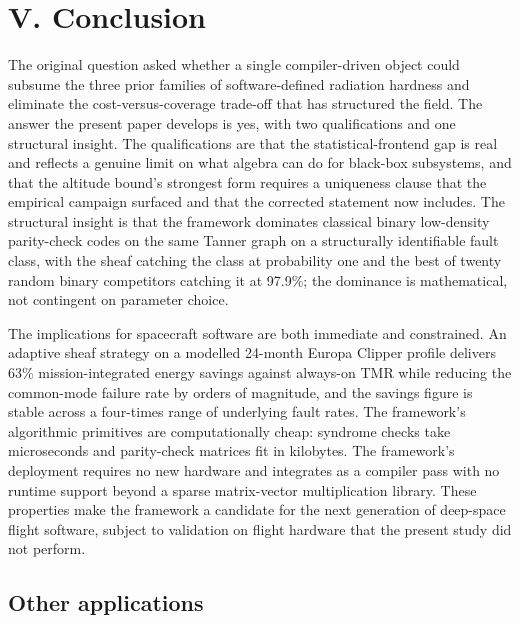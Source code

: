 \documentclass[12pt,a4paper]{article}
\theoremstyle{plain}
\theoremstyle{definition}
\begin{document}
\section{V. Conclusion}

The original question asked whether a single compiler-driven object could subsume the three prior families of software-defined radiation hardness and eliminate the cost-versus-coverage trade-off that has structured the field. The answer the present paper develops is yes, with two qualifications and one structural insight. The qualifications are that the statistical-frontend gap is real and reflects a genuine limit on what algebra can do for black-box subsystems, and that the altitude bound's strongest form requires a uniqueness clause that the empirical campaign surfaced and that the corrected statement now includes. The structural insight is that the framework dominates classical binary low-density parity-check codes on the same Tanner graph on a structurally identifiable fault class, with the sheaf catching the class at probability one and the best of twenty random binary competitors catching it at 97.9\%; the dominance is mathematical, not contingent on parameter choice.

The implications for spacecraft software are both immediate and constrained. An adaptive sheaf strategy on a modelled 24-month Europa Clipper profile delivers 63\% mission-integrated energy savings against always-on TMR while reducing the common-mode failure rate by orders of magnitude, and the savings figure is stable across a four-times range of underlying fault rates. The framework's algorithmic primitives are computationally cheap: syndrome checks take microseconds and parity-check matrices fit in kilobytes. The framework's deployment requires no new hardware and integrates as a compiler pass with no runtime support beyond a sparse matrix-vector multiplication library. These properties make the framework a candidate for the next generation of deep-space flight software, subject to validation on flight hardware that the present study did not perform.

\subsection{Other applications}
\end{document}
